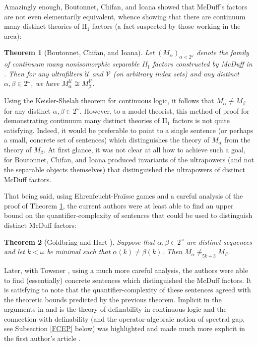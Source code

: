\documentclass[12pt]{amsart}
\newtheorem{thm}{Theorem}[section]
\theoremstyle{definition}
\def\cal{\mathcal}
\def\u{\mathsf 1}
\def \u{\mathcal U}
\begin{document}
Amazingly enough, Boutonnet, Chifan, and Ioana \cite{BCI} showed that McDuff's factors are not even elementarily equivalent, whence showing that there are continuum many distinct theories of II$_1$ factors (a fact suspected by those working in the area):

\begin{thm}[Boutonnet, Chifan, and Ioana]\label{BCItheorem}
Let $(M_\alpha)_{\alpha<2^{\omega}}$ denote the family of continuum many nonisomorphic separable II$_1$ factors constructed by McDuff in \cite{McD2}.  Then for any ultrafilters $\u$ and $\cal V$ (on arbitrary index sets) and any distinct $\alpha,\beta\in 2^{\omega}$, we have $M_\alpha^\u\not\cong M_\beta^{\cal V}$.
\end{thm}

Using the Keisler-Shelah theorem for continuous logic, it follows that $M_\alpha\not\equiv M_\beta$ for any distinct $\alpha,\beta\in 2^{\omega}$.  However, to a model theorist, this method of proof for demonstrating continuum many distinct theories of II$_1$ factors is not quite satisfying.  Indeed, it would be preferable to point to a single sentence (or perhaps a small, concrete set of sentences) which distinguishes the theory of $M_\alpha$ from the theory of $M_\beta$.  At first glance, it was not clear at all how to achieve such a goal, for Boutonnet, Chifan, and Ioana produced invariants of the ultrapowers (and not the separable objects themselves) that distinguished the ultrapowers of distinct McDuff factors.

That being said, using Ehrenfeucht-Fra\"isse games and a careful analysis of the proof of Theorem \ref{BCItheorem}, the current authors were at least able to find an upper bound on the quantifier-complexity of sentences that could be used to distinguish distinct McDuff factors:

\begin{thm}[Goldbring and Hart \cite{GHgames}]
Suppose that $\alpha,\beta\in 2^{\omega}$ are distinct sequences and let $k<\omega$ be minimal such that $\alpha(k)\not=\beta(k)$.  Then $M_\alpha\not\equiv_{5k+3}M_\beta$.
\end{thm}

Later, with Towsner \cite{GHT}, using a much more careful analysis, the authors were able to find (essentially) concrete sentences which distinguished the McDuff factors.  It is satisfying to note that the quantifier-complexity of these sentences agreed with the theoretic bounds predicted by the previous theorem.  Implicit in the arguments in \cite{GHgames} and \cite{GHT} is the theory of definability in continuous logic and the connection with definability (and the operator-algebraic notion of spectral gap, see Subsection \ref{FCEP} below) was highlighted and made much more explicit in the first author's article \cite{spgap}.
\end{document}
